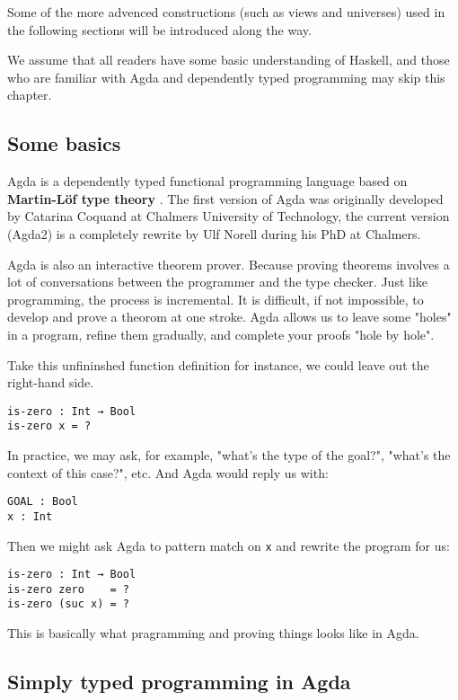 \documentclass[12pt, a4paper]{article}
\begin{document}
Some of the more advenced constructions (such as views and universes) used in
the following sections will be introduced along the way.

We assume that all readers have some basic understanding of Haskell, and those
who are familiar with Agda and dependently typed programming may skip this chapter.

\subsection{Some basics}
Agda is a dependently typed functional programming language based on
\textbf{Martin-Löf type theory} \cite{martin1984intuitionistic}.
The first version of Agda was originally developed by Catarina Coquand at Chalmers
University of Technology, the current version (Agda2) is a completely rewrite by
Ulf Norell during his PhD at Chalmers.

Agda is also an interactive theorem prover. Because proving theorems involves a
lot of conversations between the programmer and the type checker. Just like programming,
the process is incremental. It is difficult, if not impossible, to develop and
prove a theorom at one stroke. Agda allows us to leave some "holes" in a
program, refine them gradually, and complete your proofs "hole by hole".

Take this unfininshed function definition for instance, we could leave out the
right-hand side.

\begin{lstlisting}
is-zero : Int → Bool
is-zero x = ?
\end{lstlisting}

In practice, we may ask, for example, "what's the type of the goal?",
 "what's the context of this case?", etc. And Agda would reply us with:

\begin{lstlisting}
GOAL : Bool
x : Int
\end{lstlisting}

Then we might ask Agda to pattern match on {\lstinline|x|} and rewrite the program for us:

\begin{lstlisting}
is-zero : Int → Bool
is-zero zero    = ?
is-zero (suc x) = ?
\end{lstlisting}

This is basically what pragramming and proving things looks like in Agda.

\subsection{Simply typed programming in Agda}
\end{document}
